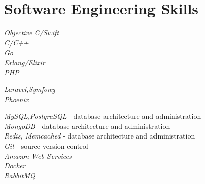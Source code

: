 \documentclass[10pt]{article}
\begin{document}

\section{Software Engineering Skills}

{
\textit{Objective C/Swift}\\
\textit{C/C++}\\
\textit{Go}\\
\textit{Erlang/Elixir}\\
\textit{PHP}\\
}


{
\textit{Laravel,Symfony}\\
\textit{Phoenix}\\
}


{
\textit{MySQL,PostgreSQL} - database architecture and administration\\
\textit{MongoDB} - database architecture and administration\\
\textit{Redis, Memcached} - database architecture and administration\\
\textit{Git} - source version control\\
\textit{Amazon Web Services}\\
\textit{Docker}\\
\textit{RabbitMQ}\\
}
\end{document}

